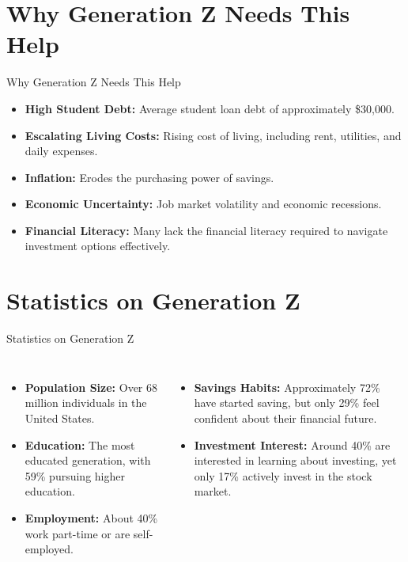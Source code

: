\documentclass{beamer}
\begin{document}
\section{Why Generation Z Needs This Help}
\begin{frame}{Why Generation Z Needs This Help}
    \begin{itemize}
        \item \textbf{High Student Debt:} Average student loan debt of approximately \$30,000.
        \item \textbf{Escalating Living Costs:} Rising cost of living, including rent, utilities, and daily expenses.
        \item \textbf{Inflation:} Erodes the purchasing power of savings.
        \item \textbf{Economic Uncertainty:} Job market volatility and economic recessions.
        \item \textbf{Financial Literacy:} Many lack the financial literacy required to navigate investment options effectively.
    \end{itemize}
\end{frame}

\section{Statistics on Generation Z}
\begin{frame}{Statistics on Generation Z}
    \begin{columns}
        \begin{itemize}
            \item \textbf{Population Size:} Over 68 million individuals in the United States.
            \item \textbf{Education:} The most educated generation, with 59\% pursuing higher education.
            \item \textbf{Employment:} About 40\% work part-time or are self-employed.
        \end{itemize}
        \begin{itemize}
            \item \textbf{Savings Habits:} Approximately 72\% have started saving, but only 29\% feel confident about their financial future.
            \item \textbf{Investment Interest:} Around 40\% are interested in learning about investing, yet only 17\% actively invest in the stock market.
        \end{itemize}
    \end{columns}
\end{frame}
\end{document}
